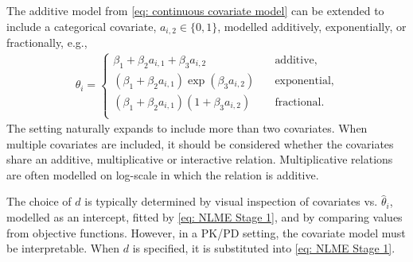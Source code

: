 The additive model from \eqref{eq: continuous covariate model} can be extended to include a categorical covariate, $a_{i,2} \in \{ 0, 1 \}$, modelled additively, exponentially, or fractionally, e.g.,
\begin{align}
    \theta_{i}  = 
    \begin{cases}
        \beta_{1} + \beta_{2} a_{i,1} + \beta_3 a_{i,2} & \text{additive}, \\
        (\beta_{1} + \beta_{2} a_{i,1} ) \exp(\beta_3 a_{i,2}) \quad & \text{exponential}, \\
      (\beta_{1} + \beta_{2} a_{i,1} ) ( 1 + \beta_3 a_{i,2}) & \text{fractional}. \\
    \end{cases}
    \label{eq: frac categorical covariate model}
\end{align}
The setting naturally expands to include more than two covariates. When multiple covariates are included, it should be considered whether the covariates share an additive, multiplicative or interactive relation.
Multiplicative relations are often modelled on log-scale in which the relation is additive. 

The choice of $d$ is typically determined by visual inspection of covariates vs. $\hat{\theta}_{i}$, modelled as an intercept, fitted by \eqref{eq: NLME Stage 1}, and by comparing values from objective functions.
However, in a PK/PD setting, the covariate model must be interpretable.
When $d$ is specified, it is substituted into \eqref{eq: NLME Stage 1}.


